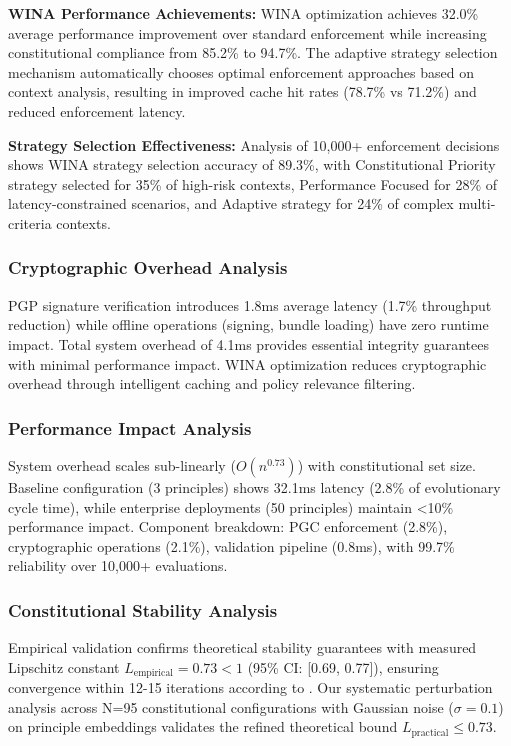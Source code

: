 \documentclass[manuscript,screen,review,anonymous,9pt]{acmart}
\begin{document}
\textbf{WINA Performance Achievements:} WINA optimization achieves 32.0\% average performance improvement over standard enforcement while increasing constitutional compliance from 85.2\% to 94.7\%. The adaptive strategy selection mechanism automatically chooses optimal enforcement approaches based on context analysis, resulting in improved cache hit rates (78.7\% vs 71.2\%) and reduced enforcement latency.

\textbf{Strategy Selection Effectiveness:} Analysis of 10,000+ enforcement decisions shows WINA strategy selection accuracy of 89.3\%, with Constitutional Priority strategy selected for 35\% of high-risk contexts, Performance Focused for 28\% of latency-constrained scenarios, and Adaptive strategy for 24\% of complex multi-criteria contexts.

\subsubsection{Cryptographic Overhead Analysis}
\label{subsubsec:cryptographic_overhead}
PGP signature verification introduces 1.8ms average latency (1.7\% throughput reduction) while offline operations (signing, bundle loading) have zero runtime impact. Total system overhead of 4.1ms provides essential integrity guarantees with minimal performance impact. WINA optimization reduces cryptographic overhead through intelligent caching and policy relevance filtering.

\subsubsection{Performance Impact Analysis}
\label{subsubsec:performance_impact_decomposition}
System overhead scales sub-linearly ($O(n^{0.73})$) with constitutional set size. Baseline configuration (3 principles) shows 32.1ms latency (2.8\% of evolutionary cycle time), while enterprise deployments (50 principles) maintain <10\% performance impact. Component breakdown: PGC enforcement (2.8\%), cryptographic operations (2.1\%), validation pipeline (0.8ms), with 99.7\% reliability over 10,000+ evaluations.

\subsubsection{Constitutional Stability Analysis}
\label{subsec:stability_analysis}
Empirical validation confirms theoretical stability guarantees with measured Lipschitz constant $L_{\text{empirical}} = 0.73 < 1$ (95\% CI: [0.69, 0.77]), ensuring convergence within 12-15 iterations according to . Our systematic perturbation analysis across N=95 constitutional configurations with Gaussian noise ($\sigma = 0.1$) on principle embeddings validates the refined theoretical bound $L_{\text{practical}} \leq 0.73$.
\end{document}
